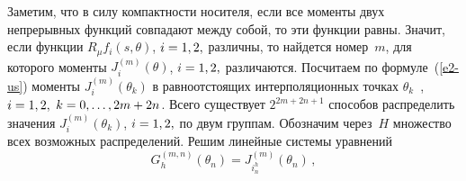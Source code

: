 \begin{multicols}{2}
Заметим, что в силу компактности носителя, если все
моменты двух непрерывных функций совпадают между собой, то эти функции
равны. Значит,
если функции $R_\mu f_{i}(s,\theta)$, $i\hm=1,2,$ различны, то найдется
номер~$m$, для которого моменты $J^{(m)}_{i}(\theta)$, $i\hm=1,2,$
различаются. Посчитаем по формуле~(\ref{e2-us}) моменты $J^{(m)}_i(\theta_k)$ в
равноотстоящих интерполяционных точках $\theta_k$~\cite{12-us}, 
$i\hm=1,2,$ $k\hm=0,\ldots,2m+2n$. Всего существует $2^{2m+2n+1}$ способов распределить
значения $J^{(m)}_i(\theta_k)$, $i\hm=1,2,$ по двум группам. Обозначим через~$H$ множество
всех возможных распределений. Решим линейные системы уравнений
\begin{equation}
G^{(m,n)}_h(\theta_{n})=J^{(m)}_{i^h_n}(\theta_{n})\,,\label{e6-us}
\end{equation}


\end{multicols}
